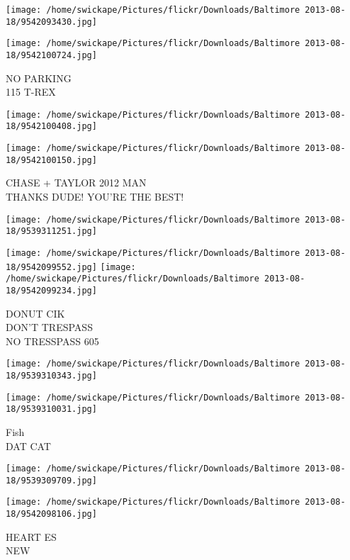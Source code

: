 \documentclass[10pt,letterpaper]{article}
\begin{document}
\texttt{[image: /home/swickape/Pictures/flickr/Downloads/Baltimore 2013-08-18/9542093430.jpg]}

\vspace{0.25in}
\texttt{[image: /home/swickape/Pictures/flickr/Downloads/Baltimore 2013-08-18/9542100724.jpg]}

NO PARKING\\
115 T{-}REX
\pagebreak

\texttt{[image: /home/swickape/Pictures/flickr/Downloads/Baltimore 2013-08-18/9542100408.jpg]}

\vspace{0.25in}
\texttt{[image: /home/swickape/Pictures/flickr/Downloads/Baltimore 2013-08-18/9542100150.jpg]}

CHASE + TAYLOR 2012 MAN\\
THANKS DUDE! YOU'RE THE BEST!
\pagebreak

\texttt{[image: /home/swickape/Pictures/flickr/Downloads/Baltimore 2013-08-18/9539311251.jpg]}

\vspace{0.25in}
\texttt{[image: /home/swickape/Pictures/flickr/Downloads/Baltimore 2013-08-18/9542099552.jpg]}
\texttt{[image: /home/swickape/Pictures/flickr/Downloads/Baltimore 2013-08-18/9542099234.jpg]}

DONUT CIK\\
DON'T TRESPASS\\
NO TRESSPASS 605
\pagebreak

\texttt{[image: /home/swickape/Pictures/flickr/Downloads/Baltimore 2013-08-18/9539310343.jpg]}

\vspace{0.25in}
\texttt{[image: /home/swickape/Pictures/flickr/Downloads/Baltimore 2013-08-18/9539310031.jpg]}

Fish\\
DAT CAT
\pagebreak

\texttt{[image: /home/swickape/Pictures/flickr/Downloads/Baltimore 2013-08-18/9539309709.jpg]}

\vspace{0.25in}
\texttt{[image: /home/swickape/Pictures/flickr/Downloads/Baltimore 2013-08-18/9542098106.jpg]}

HEART ES\\
NEW
\pagebreak
\end{document}
